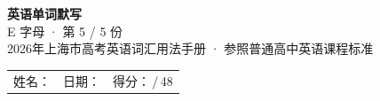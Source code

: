 \documentclass[10pt,a4paper]{article}
\begin{document}
\pagestyle{plain}

\begin{center}
{\LARGE\bfseries 英语单词默写}\\[0.22em]
{\large E 字母 · 第 5 / 5 份}\\[0.18em]
{\small 2026年上海市高考英语词汇用法手册 · 参照普通高中英语课程标准}
\end{center}

\vspace{0.25em}
\noindent\begin{tabular}{@{}p{}@{}p{}@{}p{}@{}}
姓名：\underline{\hspace{2.0cm}} & 日期：\underline{\hspace{2.0cm}} & 得分：\underline{\hspace{1.3cm}}\,/\,48 \\
\end{tabular}

\vspace{0.3em}

\vspace{0.08em}
\end{document}

